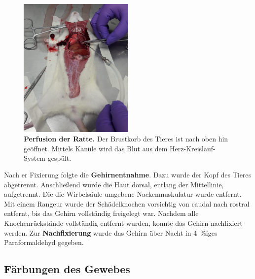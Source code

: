 \documentclass[12pt,a4paper,pdftex]{article}
\begin{document}
\begin{figure}[H]
    \centering
    \includegraphics[width=0.5\textwidth]{pictures/Bilder_Jule/Ratte/perfusion.png}
    \caption[Perfusion der Ratte]{\textbf{Perfusion der Ratte.} Der Brustkorb des Tieres ist nach oben hin geöffnet. Mittels Kanüle wird das Blut aus dem Herz-Kreislauf-System gespült.}
    \label{fig:perfusion}
\end{figure}

Nach er Fixierung folgte die \textbf{Gehirnentnahme}. Dazu wurde der Kopf des Tieres abgetrennt. Anschließend wurde die Haut dorsal, entlang der Mittellinie, aufgetrennt. Die die Wirbelsäule umgebene Nackenmuskulatur wurde entfernt. Mit einem Rangeur wurde der Schädelknochen vorsichtig von caudal nach rostral entfernt, bis das Gehirn vollständig freigelegt war. Nachdem alle Knochenrückstände vollständig entfernt wurden, konnte das Gehirn nachfixiert werden. Zur \textbf{Nachfixierung} wurde das Gehirn über Nacht in 4~\%iges Paraformaldehyd gegeben.

\subsection{Färbungen des Gewebes}
\end{document}
